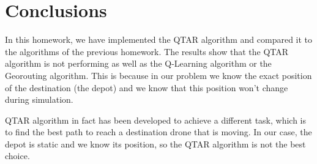 \section{Conclusions}
In this homework, we have implemented the QTAR algorithm and compared it to the algorithms of the previous homework.
The results show that the QTAR algorithm is not performing as well as the Q-Learning algorithm or the Georouting algorithm.
This is because in our problem we know the exact position of the destination (the depot) and we know that this position won't change during simulation.

QTAR algorithm in fact has been developed to achieve a different task, which is to find the best path to reach a destination drone that is moving.
In our case, the depot is static and we know its position, so the QTAR algorithm is not the best choice.
